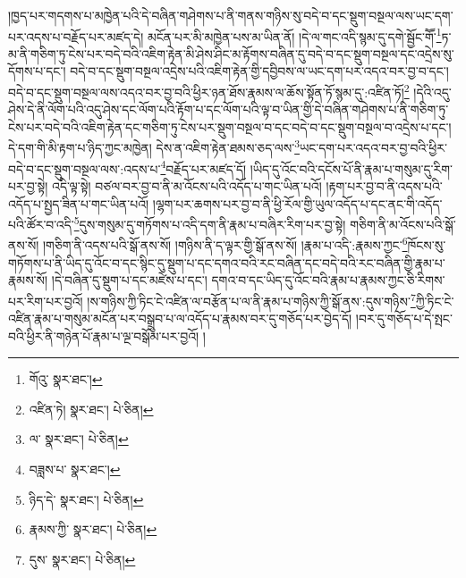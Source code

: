 །ཁྱད་པར་གདགས་པ་མཁྱེན་པའི་དེ་བཞིན་གཤེགས་པ་ནི་གནས་གཉིས་སུ་བདེ་བ་དང་སྡུག་བསྔལ་ལས་ཡང་དག་པར་འདས་པ་བརྗོད་པར་མཛད་དེ། མངོན་པར་མི་མཁྱེན་པས་མ་ཡིན་ནོ། །དེ་ལ་གང་འདི་སྙམ་དུ་དགེ་སྦྱོང་གཽ་\footnote{གོའུ་  སྣར་ཐང་། }ཏ་མ་ནི་གཅིག་ཏུ་ངེས་པར་བདེ་བའི་འཇིག་རྟེན་མི་ཤེས་ཤིང་མ་རྟོགས་བཞིན་དུ་བདེ་བ་དང་སྡུག་བསྔལ་དང་འདྲེས་སུ་དོགས་པ་དང་། བདེ་བ་དང་སྡུག་བསྔལ་འདྲེས་པའི་འཇིག་རྟེན་གྱི་དབྱིབས་ལ་ཡང་དག་པར་འདའ་བར་བྱ་བ་དང་། བདེ་བ་དང་སྡུག་བསྔལ་ལས་འདའ་བར་བྱ་བའི་ཕྱིར་ཉན་ཐོས་རྣམས་ལ་ཆོས་སྟོན་ཏོ་སྙམ་དུ་:འཛིན་ཏོ།\footnote{འཛིན་ཏེ།  སྣར་ཐང་།  པེ་ཅིན། } །དེའི་འདུ་ཤེས་དེ་ནི་ལོག་པའི་འདུ་ཤེས་དང་ལོག་པའི་རྟོག་པ་དང་ལོག་པའི་ལྟ་བ་ཡིན་གྱི་དེ་བཞིན་གཤེགས་པ་ནི་གཅིག་ཏུ་ངེས་པར་བདེ་བའི་འཇིག་རྟེན་དང་གཅིག་ཏུ་ངེས་པར་སྡུག་བསྔལ་བ་དང་བདེ་བ་དང་སྡུག་བསྔལ་བ་འདྲེས་པ་དང་། དེ་དག་གི་མི་རྟག་པ་ཉིད་ཀྱང་མཁྱེན། དེས་ན་འཇིག་རྟེན་ཐམས་ཅད་ལས་\footnote{ལ་  སྣར་ཐང་།  པེ་ཅིན། }ཡང་དག་པར་འདའ་བར་བྱ་བའི་ཕྱིར་བདེ་བ་དང་སྡུག་བསྔལ་ལས་:འདས་པ་\footnote{བཟླས་པ་  སྣར་ཐང་། }བརྗོད་པར་མཛད་དོ། །ཡིད་དུ་འོང་བའི་དངོས་པོ་ནི་རྣམ་པ་གསུམ་དུ་རིག་པར་བྱ་སྟེ། འདི་ལྟ་སྟེ། བཙལ་བར་བྱ་བ་ནི་མ་འོངས་པའི་འདོད་པ་གང་ཡིན་པའོ། །རྟག་པར་བྱ་བ་ནི་འདས་པའི་འདོད་པ་སྤྱད་ཟིན་པ་གང་ཡིན་པའོ། །ལྷག་པར་ཆགས་པར་བྱ་བ་ནི་ཕྱི་རོལ་གྱི་ཡུལ་འདོད་པ་དང་ནང་གི་འདོད་པའི་ཚོར་བ་འདི་\footnote{ཉིད་དེ་  སྣར་ཐང་།  པེ་ཅིན། }དུས་གསུམ་དུ་གཏོགས་པ་འདི་དག་ནི་རྣམ་པ་བཞིར་རིག་པར་བྱ་སྟེ། གཅིག་ནི་མ་འོངས་པའི་སྒོ་ནས་སོ། །གཅིག་ནི་འདས་པའི་སྒོ་ནས་སོ། །གཉིས་ནི་ད་ལྟར་གྱི་སྒོ་ནས་སོ། །རྣམ་པ་འདི་:རྣམས་ཀྱང་\footnote{རྣམས་ཀྱི་  སྣར་ཐང་།  པེ་ཅིན། }ཁོངས་སུ་གཏོགས་པ་ནི་ཡིད་དུ་འོང་བ་དང་སྙིང་དུ་སྡུག་པ་དང་དགའ་བའི་རང་བཞིན་དང་བདེ་བའི་རང་བཞིན་གྱི་རྣམ་པ་རྣམས་སོ། །དེ་བཞིན་དུ་སྡུག་པ་དང་མཛེས་པ་དང་། དགའ་བ་དང་ཡིད་དུ་འོང་བའི་རྣམ་པ་རྣམས་ཀྱང་ཅི་རིགས་པར་རིག་པར་བྱའོ། །ས་གཉིས་ཀྱི་ཏིང་ངེ་འཛིན་ལ་བརྩོན་པ་ལ་ནི་རྣམ་པ་གཉིས་ཀྱི་སྒོ་ནས་:དུས་གཉིས་\footnote{དུས་  སྣར་ཐང་།  པེ་ཅིན། }ཀྱི་ཏིང་ངེ་འཛིན་རྣམ་པ་གསུམ་མངོན་པར་བསྒྲུབ་པ་ལ་འདོད་པ་རྣམས་བར་དུ་གཅོད་པར་བྱེད་དོ། །བར་དུ་གཅོད་པ་དེ་སྤང་བའི་ཕྱིར་ནི་གཉེན་པོ་རྣམ་པ་ལྔ་བསྒོམ་པར་བྱའོ། །
